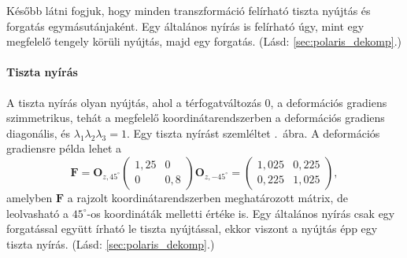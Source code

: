 \documentclass[12pt,a4paper]{scrartcl}
\let\mathbf\bm
\begin{document}
Később látni fogjuk, hogy minden transzformáció felírható tiszta nyújtás és forgatás egymásutánjaként. Egy általános nyírás is felírható úgy, mint egy megfelelő tengely körüli nyújtás, majd egy forgatás. (Lásd: \ref{sec:polaris_dekomp}.)


\paragraph{Tiszta nyírás} \label{sec:tiszta_nyiras}
A tiszta nyírás olyan nyújtás, ahol a térfogatváltozás 0, a deformációs gradiens szimmetrikus, tehát a megfelelő koordinátarendszerben a deformációs gradiens diagonális, és ${\lambda _1}{\lambda _2}{\lambda _3} = 1$. Egy tiszta nyírást szemléltet \az{\ref{fig:tiszta_nyiras}}.\ ábra. A deformációs gradiensre példa lehet a 
\[{\mathbf{F}} = {{\mathbf{O}}_{z,45^\circ }}\left( {\begin{array}{*{20}{c}}
  {1,25}&0 \\ 
  0&{0,8} 
\end{array}} \right){{\mathbf{O}}_{z, - 45^\circ }} = \left( {\begin{array}{*{20}{c}}
  {1,025}&{0,225} \\ 
  {0,225}&{1,025} 
\end{array}} \right),\]
amelyben ${\mathbf{F}}$ a rajzolt koordinátarendszerben meghatározott mátrix, de leolvasható a $45^\circ$-os koordináták melletti értéke is. Egy általános nyírás csak egy forgatással együtt írható le tiszta nyújtással, ekkor viszont a nyújtás épp egy tiszta nyírás. (Lásd: \ref{sec:polaris_dekomp}.)
\end{document}
